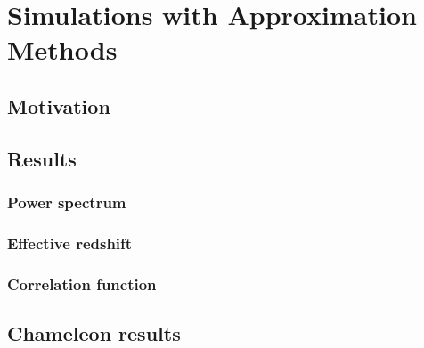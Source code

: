 \chapter{Simulations with Approximation Methods}

\section{Motivation}

\section{Results}

\subsection{Power spectrum}

\subsection{Effective redshift}

\subsection{Correlation function}

\section{Chameleon results}